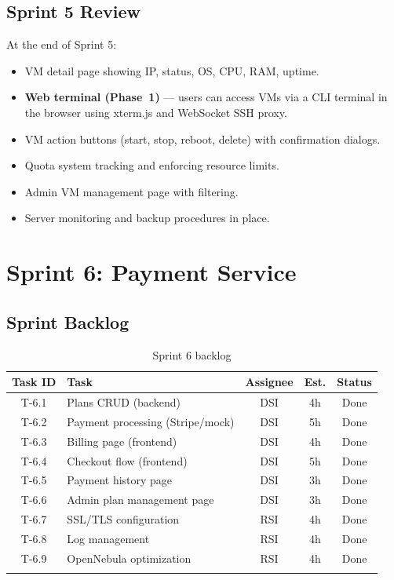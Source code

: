 \subsection{Sprint 5 Review}

At the end of Sprint 5:
\begin{itemize}
  \item VM detail page showing IP, status, OS, CPU, RAM, uptime.
  \item \textbf{Web terminal (Phase~1)} --- users can access VMs via a CLI terminal in the browser using xterm.js and WebSocket SSH proxy.
  \item VM action buttons (start, stop, reboot, delete) with confirmation dialogs.
  \item Quota system tracking and enforcing resource limits.
  \item Admin VM management page with filtering.
  \item Server monitoring and backup procedures in place.
\end{itemize}


\section{Sprint 6: Payment Service}


\subsection{Sprint Backlog}

\begin{longtable}{|c|p{5cm}|c|c|c|}
\hline
\rowcolor{blue!15}
\textbf{Task ID} & \textbf{Task} & \textbf{Assignee} & \textbf{Est.} & \textbf{Status} \\
\hline
\endhead
T-6.1 & Plans CRUD (backend) & DSI & 4h & Done \\
\hline
T-6.2 & Payment processing (Stripe/mock) & DSI & 5h & Done \\
\hline
T-6.3 & Billing page (frontend) & DSI & 4h & Done \\
\hline
T-6.4 & Checkout flow (frontend) & DSI & 5h & Done \\
\hline
T-6.5 & Payment history page & DSI & 3h & Done \\
\hline
T-6.6 & Admin plan management page & DSI & 3h & Done \\
\hline
T-6.7 & SSL/TLS configuration & RSI & 4h & Done \\
\hline
T-6.8 & Log management & RSI & 4h & Done \\
\hline
T-6.9 & OpenNebula optimization & RSI & 4h & Done \\
\hline
\caption{Sprint 6 backlog}
\label{tab:sprint6-backlog}
\end{longtable}

